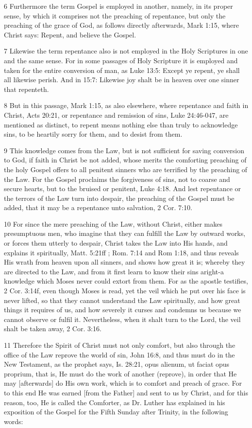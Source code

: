 6 Furthermore the term Gospel is employed in another, namely, in its proper sense, by which it comprises not the preaching of repentance, but only the preaching of the grace of God, as follows directly afterwards, Mark 1:15, where Christ says: Repent, and believe the Gospel.

7 Likewise the term repentance also is not employed in the Holy Scriptures in one and the same sense. For in some passages of Holy Scripture it is employed and taken for the entire conversion of man, as Luke 13:5: Except ye repent, ye shall all likewise perish. And in 15:7: Likewise joy shalt be in heaven over one sinner that repenteth.

8 But in this passage, Mark 1:15, as also elsewhere, where repentance and faith in Christ, Acts 20:21, or repentance and remission of sins, Luke 24:46-047, are mentioned as distinct, to repent means nothing else than truly to acknowledge sins, to be heartily sorry for them, and to desist from them.

9 This knowledge comes from the Law, but is not sufficient for saving conversion to God, if faith in Christ be not added, whose merits the comforting preaching of the holy Gospel offers to all penitent sinners who are terrified by the preaching of the Law. For the Gospel proclaims the forgiveness of sins, not to coarse and secure hearts, but to the bruised or penitent, Luke 4:18. And lest repentance or the terrors of the Law turn into despair, the preaching of the Gospel must be added, that it may be a repentance unto salvation, 2 Cor. 7:10.

10 For since the mere preaching of the Law, without Christ, either makes presumptuous men, who imagine that they can fulfill the Law by outward works, or forces them utterly to despair, Christ takes the Law into His hands, and explains it spiritually, Matt. 5:21ff ; Rom. 7:14 and Rom 1:18, and thus reveals His wrath from heaven upon all sinners, and shows how great it is; whereby they are directed to the Law, and from it first learn to know their sins aright-a knowledge which Moses never could extort from them. For as the apostle testifies, 2 Cor. 3:14f, even though Moses is read, yet the veil which he put over his face is never lifted, so that they cannot understand the Law spiritually, and how great things it requires of us, and how severely it curses and condemns us because we cannot observe or fulfil it. Nevertheless, when it shalt turn to the Lord, the veil shalt be taken away, 2 Cor. 3:16.

11 Therefore the Spirit of Christ must not only comfort, but also through the office of the Law reprove the world of sin, John 16:8, and thus must do in the New Testament, as the prophet says, Is. 28:21, opus alienum, ut faciat opus proprium, that is, He must do the work of another (reprove), in order that He may [afterwards] do His own work, which is to comfort and preach of grace. For to this end He was earned [from the Father] and sent to us by Christ, and for this reason, too, He is called the Comforter, as Dr. Luther has explained in his exposition of the Gospel for the Fifth Sunday after Trinity, in the following words:

